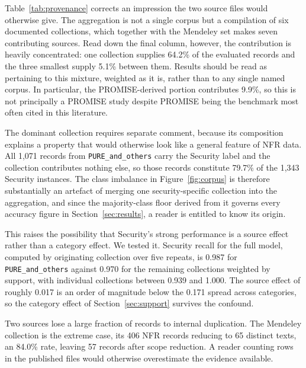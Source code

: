 \documentclass[11pt,a4paper]{article}
\begin{document}
Table~\ref{tab:provenance} corrects an impression the two source files would otherwise
give. The aggregation is not a single corpus but a compilation of six documented
collections, which together with the Mendeley set makes seven contributing sources. Read
down the final column, however, the contribution is heavily concentrated: one collection
supplies 64.2\% of the evaluated records and the three smallest supply 5.1\% between them.
Results should be read as pertaining to this mixture, weighted as it is, rather than to any
single named corpus. In particular, the PROMISE-derived portion contributes 9.9\%, so this
is not principally a PROMISE study despite PROMISE being the benchmark most often cited in
this literature.

The dominant collection requires separate comment, because its composition explains a
property that would otherwise look like a general feature of NFR data. All 1,071 records from
\texttt{PURE\_and\_others} carry the Security label and the collection contributes nothing
else, so those records constitute 79.7\% of the 1{,}343 Security instances. The class
imbalance in Figure~\ref{fig:corpus} is therefore substantially an artefact of merging one
security-specific collection into the aggregation, and since the majority-class floor derived
from it governs every accuracy figure in Section~\ref{sec:results}, a reader is entitled to
know its origin.

This raises the possibility that Security's strong performance is a source effect rather than
a category effect. We tested it. Security recall for the full model, computed by originating
collection over five repeats, is 0.987 for \texttt{PURE\_and\_others} against 0.970 for the
remaining collections weighted by support, with individual collections between 0.939 and
1.000. The source effect of roughly 0.017 is an order of magnitude below the 0.171 spread
across categories, so the category effect of Section~\ref{sec:support} survives the
confound.

Two sources lose a large fraction of records to internal duplication. The Mendeley
collection is the extreme case, its 406 NFR records reducing to 65 distinct texts, an 84.0\%
rate, leaving 57 records after scope reduction. A reader counting rows in the published files
would otherwise overestimate the evidence available.
\end{document}
